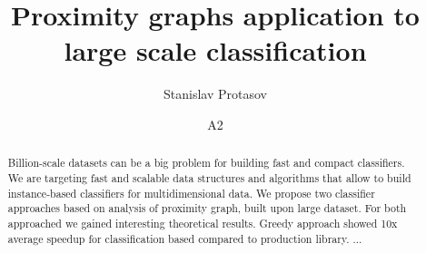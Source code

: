\documentclass[twocolumn,final]{svjour3}
\begin{document}
\author{Stanislav Protasov \and A2}
\title{Proximity graphs application to large scale classification}
\maketitle{}					%


\begin{abstract}
Billion-scale datasets can be a big problem for building fast and compact classifiers.
We are targeting fast and scalable data structures and algorithms that allow to build instance-based classifiers for multidimensional data.
We propose two classifier approaches based on analysis of proximity graph, built upon large dataset.
For both approached we gained interesting theoretical results. Greedy approach showed 10x average speedup for classification based compared to production library.
...
\end{abstract}










\end{document}
